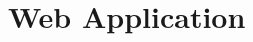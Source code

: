 
\section{Web Application}

\hypertarget{website_CodeDocumentation}
{
    \label{website_CodeDocumentation}
}
